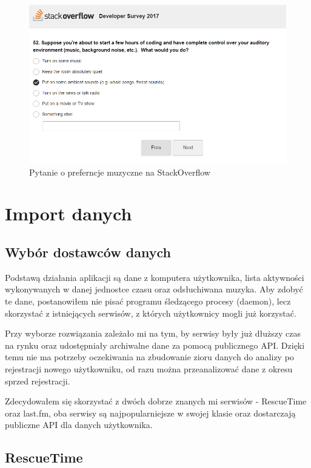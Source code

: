 \documentclass[brudnopis]{xmgr}
\begin{document}
\begin{figure}
  \includegraphics[width=\linewidth]{fig/stack_overflow_music.png}
  \caption{Pytanie o preferncje muzyczne na StackOverflow}
  \label{fig:Pytanie o preferncje muzyczne na StackOverflow}
\end{figure}

\chapter{Import danych}

    \section{Wybór dostawców danych}

    Podstawą działania aplikacji są dane z komputera użytkownika,
    lista aktywności wykonywanych w danej jednostce czasu oraz odsłuchiwana muzyka.
    Aby zdobyć te dane, postanowiłem nie pisać programu śledzącego procesy (daemon),
    lecz skorzystać z istniejących serwisów, z których użytkownicy mogli już korzystać.

    Przy wyborze rozwiązania zależało mi na tym, by serwisy były już dłuższy czas na rynku
    oraz udostępniały archiwalne dane za pomocą publicznego API.
    Dzięki temu nie ma potrzeby oczekiwania na zbudowanie zioru danych do analizy po rejestracji nowego użytkowniku,
    od razu można przeanalizować dane z okresu sprzed rejestracji.

    Zdecydowałem się skorzystać z dwóch dobrze znanych mi serwisów - RescueTime oraz last.fm,
    oba serwisy są najpopularniejsze w swojej klasie oraz dostarczają publiczne API dla danych użytkownika.

        \section*{RescueTime}
\end{document}
